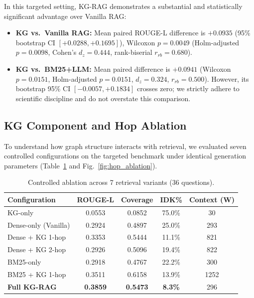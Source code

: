 \documentclass[conference]{IEEEtran}
\begin{document}
In this targeted setting, KG-RAG demonstrates a substantial and statistically significant advantage over Vanilla RAG:
\begin{itemize}
    \item \textbf{KG vs.\ Vanilla RAG:} Mean paired ROUGE-L difference is $+0.0935$ (95\% bootstrap CI $[+0.0288, +0.1695]$), Wilcoxon $p=0.0049$ (Holm-adjusted $p=0.0098$, Cohen's $d_z=0.444$, rank-biserial $r_{rb}=0.680$).
    \item \textbf{KG vs.\ BM25+LLM:} Mean paired difference is $+0.0941$ (Wilcoxon $p=0.0151$, Holm-adjusted $p=0.0151$, $d_z=0.324$, $r_{rb}=0.500$). However, its bootstrap 95\% CI $[-0.0057, +0.1834]$ crosses zero; we strictly adhere to scientific discipline and do not overstate this comparison.
\end{itemize}

\subsection{KG Component and Hop Ablation}
\label{sec:res_ablation}

To understand how graph structure interacts with retrieval, we evaluated seven controlled configurations on the targeted benchmark under identical generation parameters (Table~\ref{tab:hop_ablation} and Fig.~\ref{fig:hop_ablation}).

\begin{table}[h]
\centering
\caption{Controlled ablation across 7 retrieval variants (36 questions).}
\label{tab:hop_ablation}
\begin{tabular}{lcccc}
\toprule
\textbf{Configuration} & \textbf{ROUGE-L} & \textbf{Coverage} & \textbf{IDK\%} & \textbf{Context (W)} \\
\midrule
KG-only                 & 0.0553 & 0.0852 & 75.0\% & 30 \\
Dense-only (Vanilla)    & 0.2924 & 0.4897 & 25.0\% & 293 \\
Dense + KG 1-hop        & 0.3353 & 0.5444 & 11.1\% & 821 \\
Dense + KG 2-hop        & 0.2926 & 0.5096 & 19.4\% & 822 \\
BM25-only               & 0.2918 & 0.4767 & 22.2\% & 300 \\
BM25 + KG 1-hop         & 0.3511 & 0.6158 & 13.9\% & 1252 \\
\textbf{Full KG-RAG}    & \textbf{0.3859} & \textbf{0.5473} & \textbf{8.3\%} & 296 \\
\bottomrule
\end{tabular}
\end{table}
\end{document}
